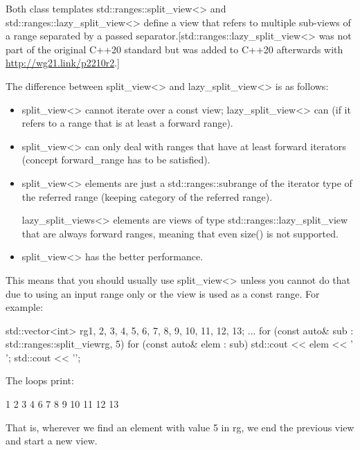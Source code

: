Both class templates std::ranges::split\_view<> and std::ranges::lazy\_split\_view<> define a view that refers to multiple sub-views of a range separated by a passed separator.[std::ranges::lazy\_split\_view<> was not part of the original C++20 standard but was added to C++20 afterwards with \url{http://wg21.link/p2210r2}.]

The difference between split\_view<> and lazy\_split\_view<> is as follows:

\begin{itemize}
\item
split\_view<> cannot iterate over a const view; lazy\_split\_view<> can (if it refers to a range that is at least a forward range).

\item
split\_view<> can only deal with ranges that have at least forward iterators (concept forward\_range has to be satisfied).

\item
split\_view<> elements are just a std::ranges::subrange of the iterator type of the referred range (keeping category of the referred range).

lazy\_split\_views<> elements are views of type std::ranges::lazy\_split\_view that are always forward ranges, meaning that even size() is not supported.

\item
split\_view<> has the better performance.
\end{itemize}

This means that you should usually use split\_view<> unless you cannot do that due to using an input range only or the view is used as a const range. For example:

\begin{cpp}
std::vector<int> rg{1, 2, 3, 4, 5, 6, 7, 8, 9, 10, 11, 12, 13};
...
for (const auto& sub : std::ranges::split_view{rg, 5}) {
	for (const auto& elem : sub) {
		std::cout << elem << ' ';
	}
	std::cout << '\n';
}
\end{cpp}

The loops print:

\begin{shell}
1 2 3 4
6 7 8 9 10 11 12 13
\end{shell}

That is, wherever we find an element with value 5 in rg, we end the previous view and start a new view.


